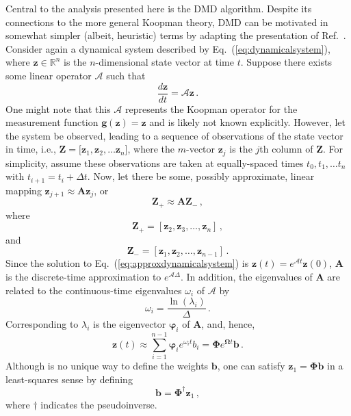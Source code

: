 \documentclass[review,number,sort&compress,12pt]{elsarticle}
\begin{document}
Central to the analysis presented here is the DMD algorithm.
Despite its connections to the more general Koopman theory, DMD can be motivated in somewhat simpler (albeit, heuristic) terms by adapting the presentation of Ref.~\cite{kutzbook}.
Consider again a dynamical system described by Eq.~(\ref{eq:dynamicalsystem}), where $\mathbf{z} \in \mathbb{R}^n$ is the $n$-dimensional state vector at time $t$.
Suppose there exists some linear operator $\mathcal{A}$ such that
\begin{equation}
 \frac{d \mathbf{z}}{dt} = \mathcal{A} \mathbf{z} \, .
 \label{eq:approxdynamicalsystem}
\end{equation}
One might note that this $\mathcal{A}$ represents the Koopman operator for the measurement function $\mathbf{g}(\mathbf{z}) = \mathbf{z}$ and is likely not known explicitly.
However, let the system be observed, leading to a sequence of observations of the state vector in time, i.e., $\mathbf{Z} = [\mathbf{z}_{1}, \mathbf{z}_{2}, \ldots \mathbf{z}_{n}$], where the $m$-vector $\mathbf{z}_{j}$ is the $j$th column of $\mathbf{Z}$. 
For simplicity, assume these observations are taken at equally-spaced times $t_0, t_1, \ldots t_n$ with $t_{i+1} = t_i + \Delta t$.  
Now, let there be some, possibly approximate, linear mapping $\mathbf{z}_{j+1} \approx \mathbf{A}\mathbf{z}_{j}$, or \begin{equation}
   \mathbf{Z}_+ \approx \mathbf{A}\mathbf{Z}_- \, ,
   \label{eq:linearmapping}
\end{equation}
where
\begin{equation}
  \mathbf{Z}_+ =  [\mathbf{z}_{2},\mathbf{z}_{3}, \ldots,\mathbf{z}_{n}] \, ,
\end{equation}
and
\begin{equation}
 \mathbf{Z}_- =  [ \mathbf{z}_{1},\mathbf{z}_{2},\ldots, \mathbf{z}_{n-1}] \,  .                                                                                                           
\end{equation}
Since the solution to Eq.~(\ref{eq:approxdynamicalsystem}) is $\mathbf{z}(t) = e^{\mathcal{A}t}\mathbf{z}(0)$, $\mathbf{A}$ is the discrete-time approximation to $e^{\mathcal{A}\Delta}$.
In addition, the  eigenvalues of $\mathbf{A}$ are related to the continuous-time eigenvalues $\omega_i$ of $\mathcal{A}$ by 
\begin{equation}
 \omega_i = \frac{\ln{(\lambda_i)}}{\Delta} \, .
\end{equation}
Corresponding to $\lambda_i$ is the eigenvector $\boldsymbol{\varphi}_i$ of $\mathbf{A}$, and, hence,
\begin{equation}
 \mathbf{z}(t) \approx \sum^{n-1}_{i=1} \boldsymbol{\varphi}_i e^{\omega_i t} b_i = \boldsymbol{\Phi}e^{\boldsymbol{\Omega}t}\mathbf{b} \, . 
\end{equation}
Although is no unique way to define the weights $\mathbf{b}$, one can satisfy $\mathbf{z}_1 = \boldsymbol{\Phi}\mathbf{b}$  in a least-squares sense by defining
\begin{equation}
 \mathbf{b} = \boldsymbol{\Phi}^{\dagger} \mathbf{z}_1 \, ,
\end{equation}
where $\dagger$ indicates the pseudoinverse. 
\end{document}

